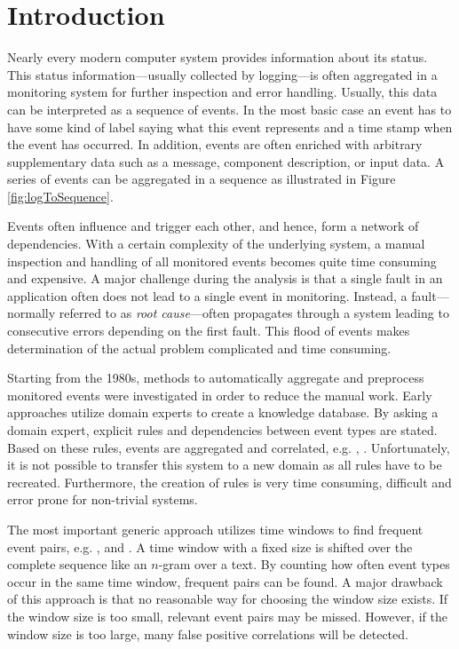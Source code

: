 \documentclass[conference]{IEEEtran}
\theoremstyle{examplestyle}
\begin{document}
\section{Introduction}
Nearly every modern computer system provides information about its status. This status information---usually collected by logging---is often aggregated in a monitoring system for further inspection and error handling. Usually, this data can be interpreted as a sequence of events. In the most basic case an event has to have some kind of label saying what this event represents and a time stamp when the event has occurred. In addition, events are often enriched with arbitrary supplementary data such as a message, component description, or input data. A series of events can be aggregated in a sequence as illustrated in Figure \ref{fig:logToSequence}.

Events often influence and trigger each other, and hence, form a network of dependencies. With a certain complexity of the underlying system, a manual inspection and handling of all monitored events becomes quite time consuming and expensive. A major challenge during the analysis is that a single fault in an application often does not lead to a single event in monitoring. Instead, a fault---normally referred to as \textit{root cause}---often propagates through a system leading to consecutive errors depending on the first fault. This flood of events makes determination of the actual problem complicated and time consuming.

Starting from the 1980s, methods to automatically aggregate and preprocess monitored events were investigated in order to reduce the manual work. Early approaches utilize domain experts to create a knowledge database. By asking a domain expert, explicit rules and dependencies between event types are stated. Based on these rules, events are aggregated and correlated, e.g. \cite{Houck1995}, \cite{Kettschau2002}. Unfortunately, it is not possible to transfer this system to a new domain as all rules have to be recreated. Furthermore, the creation of rules is very time consuming, difficult and error prone for non-trivial systems.

The most important generic approach utilizes time windows to find frequent event pairs, e.g. \cite{Jakobson1993}, \cite{Mannila1997} and \cite{Bouandas2007}. A time window with a fixed size is shifted over the complete sequence like an \(n\)-gram over a text. By counting how often event types occur in the same time window, frequent pairs can be found. A major drawback of this approach is that no reasonable way for choosing the window size exists. If the window size is too small, relevant event pairs may be missed. However, if the window size is too large, many false positive correlations will be detected.
\end{document}
